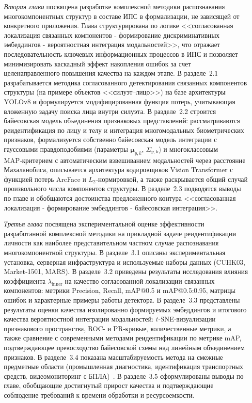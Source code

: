 \emph{Вторая глава} посвящена разработке комплексной методики
распознавания многокомпонентных структур в составе ИПС в формализации,
не зависящей от конкретного приложения. Глава структурирована по
логике <<согласованная локализация связанных компонентов - формирование
дискриминативных эмбеддингов - вероятностная интеграция модальностей>>, что
отражает последовательность ключевых информационных процессов в ИПС
и позволяет минимизировать каскадный эффект накопления ошибок за счет
целенаправленного повышения качества на каждом этапе. В разделе~2.1
разрабатывается методика согласованного детектирования связанных
компонентов структуры (на примере объектов <<силуэт--лицо>>) на базе
архитектуры YOLOv8 и формулируется модифицированная функция потерь,
учитывающая вложенную задачу поиска лица внутри силуэта. В разделе~2.2
строится байесовская модель объединения признаковых представлений:
рассматриваются реидентификация по лицу и телу и интеграция
многомодальных биометрических признаков, формализуется собственно
байесовская модель интеграции с гауссовыми правдоподобиями (параметры
$\boldsymbol{\mu}_{y,k}$, $\Sigma_{y,k}$) и многоклассовым MAP‑критерием
с автоматическим взвешиванием модальностей через расстояние Махаланобиса,
описывается архитектура кодировщиков Vision Transformer с функцией потерь
ArcFace и $L_2$‑нормировкой, а также раскрывается общий случай
произвольного числа компонентов структуры. В разделе~2.3 подводятся
выводы по главе и обобщаются достоинства предложенного контура
<<согласованная локализация - формирование эмбеддингов - байесовская
интеграция>>.

\emph{Третья глава} посвящена экспериментальной оценке эффективности
разработанной комплексной методики на прикладной задаче реидентификации
личности как наиболее представительном частном случае распознавания
многокомпонентной структуры. В разделе~3.1 описаны экспериментальная
установка, серверная инфраструктура и используемые наборы данных
(CUHK03, Market‑1501, MARS). В разделе~3.2 приведены результаты
исследования влияния коэффициента $\lambda_{\text{inner}}$ на качество
согласованной локализации связанных компонентов: метрики Precision,
Recall, mAP@0.5 и mAP@0.5:0.95, матрицы ошибок и характерные примеры
работы детектора. В разделе~3.3 представлены результаты оценки качества
изолированно формируемых эмбеддингов и итогового качества вероятностной
интеграции модальностей: $t$‑SNE‑визуализации признакового пространства,
ROC‑ и PR‑кривые, количественные метрики, а также сравнение с
современными методами реидентификации по метрике mAP, подтверждающее превосходство
байесовской схемы над линейным объединением признаков. В разделе~3.4
показана масштабируемость метода на смежные предметные области
(промышленная диагностика, идентификация транспортных средств,
видеомониторинг с
БПЛА)~\cite{Rusakov2021corrosion,Rusakov2020license,Rusakov2023uavspeed,Rusakov2024marine}.
В разделе~3.5 сформулированы выводы по главе, обобщающие достигнутый
прирост качества и подтверждающие соблюдение требований к времени
обработки и ресурсоемкости.

